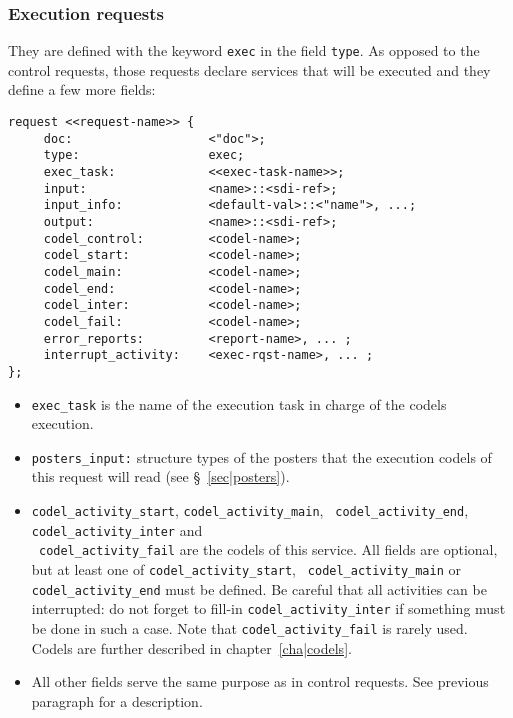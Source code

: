 \subsubsection{Execution requests}

They are defined with the keyword {\tt exec} in the field {\tt type}. As
opposed to the control requests, those requests declare services that
will be executed and they define a few more fields:

\begin{center}\begin{cartouche}\small\begin{verbatim}
request <<request-name>> {
     doc:                   <"doc">;
     type:                  exec;
     exec_task:             <<exec-task-name>>;
     input:                 <name>::<sdi-ref>;
     input_info:            <default-val>::<"name">, ...;
     output:                <name>::<sdi-ref>;
     codel_control:         <codel-name>;
     codel_start:           <codel-name>;
     codel_main:            <codel-name>;
     codel_end:             <codel-name>;
     codel_inter:           <codel-name>;
     codel_fail:            <codel-name>;
     error_reports:         <report-name>, ... ;
     interrupt_activity:    <exec-rqst-name>, ... ;
};
\end{verbatim}\end{cartouche}\end{center}

\begin{itemize}
\item {\tt exec\_task} is the name of the execution task in charge of the
codels execution.

\item {\tt posters\_input:} structure types of the posters that the
execution codels of this request will read (see \S~\vref{sec|posters}).

\item {\tt codel\_activity\_start}, {\tt codel\_activity\_main}, {\tt
codel\_activity\_end}, {\tt codel\_activity\_inter} and \\ {\tt
codel\_activity\_fail} are the codels of this service.  All fields are
optional, but at least one of {\tt codel\_activity\_start}, {\tt
codel\_activity\_main} or {\tt codel\_activity\_end} must be defined.
Be careful that all activities can be interrupted: do not forget to
fill-in {\tt codel\_activity\_inter} if something must be done in such a
case.
Note that {\tt codel\_activity\_fail} is rarely used.
Codels are further described in chapter~\ref{cha|codels}.


\item All other fields serve the same purpose  as in control  requests.
See previous paragraph for a description.

\end{itemize}


